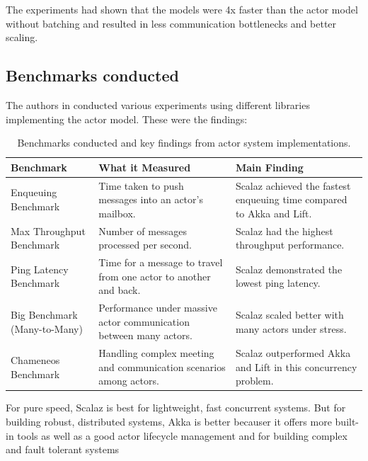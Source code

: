 The experiments had shown that the models were 4x faster than the actor model without batching and resulted in less communication bottlenecks and better scaling.

\subsection{Benchmarks conducted}
The authors in \cite{8892329} conducted various experiments using different libraries implementing the actor model. These were the findings:

\begin{table}[H]
    \centering
    \begin{tabularx}{\textwidth}{|>{\raggedright\arraybackslash}X|>{\raggedright\arraybackslash}X|>{\raggedright\arraybackslash}X|}
        \hline
        \textbf{Benchmark} & \textbf{What it Measured} & \textbf{Main Finding} \\
        \hline
        Enqueuing Benchmark & Time taken to push messages into an actor's mailbox. & Scalaz achieved the fastest enqueuing time compared to Akka and Lift. \\
        \hline
        Max Throughput Benchmark & Number of messages processed per second. & Scalaz had the highest throughput performance. \\
        \hline
        Ping Latency Benchmark & Time for a message to travel from one actor to another and back. & Scalaz demonstrated the lowest ping latency. \\
        \hline
        Big Benchmark (Many-to-Many) & Performance under massive actor communication between many actors. & Scalaz scaled better with many actors under stress. \\
        \hline
        Chameneos Benchmark & Handling complex meeting and communication scenarios among actors. & Scalaz outperformed Akka and Lift in this concurrency problem. \\
        \hline
    \end{tabularx}
    \caption{Benchmarks conducted and key findings from actor system implementations.}
    \label{tab:benchmarks_conducted}
\end{table}

For pure speed, Scalaz is best for lightweight, fast concurrent systems. But for building robust, distributed systems, Akka is better becauser it offers more built-in tools as well as a good actor lifecycle management and for building complex and fault tolerant systems








